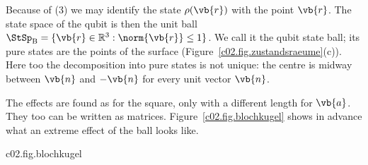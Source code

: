 Because of (3) we may identify the state $\rho(\vb{r})$ with the point $\vb{r}$. The state
space of the qubit is then the unit ball
$\StSp_{\mathrm{B}} = \{ \vb{r} \in \mathbb{R}^3 : \norm{\vb{r}} \leq 1 \}$. We call it
the qubit state ball; its pure states are the points of the surface
(Figure~\ref{c02.fig.zustandsraeume}(c)). Here too the decomposition into pure states is
not unique: the centre is midway between $\vb{n}$ and $-\vb{n}$ for every unit vector
$\vb{n}$.

The effects are found as for the square, only with a different length for $\vb{a}$. They
too can be written as matrices. Figure~\ref{c02.fig.blochkugel} shows in advance what an
extreme effect of the ball looks like.

\begin{tpcfigure}{c02.fig.blochkugel}
  \caption{The qubit state ball with the extreme effect
    $f_{\vb{n}}(\vb{r}) = \tfrac12(1 + \vb{n}\cdot\vb{r})$ of
    Proposition~\ref{c02.prop.qubit-effekte} for $\vb{n} = (0,0,1)$, that is,
    $f_{\vb{n}}(\vb{r}) = \tfrac12(1 + r_z)$. The points of equal probability form
    horizontal planes. The plane $f = 1$ touches the ball in the pure state $\vb{n}$
    (top), the plane $f = 0$ in the pure state $-\vb{n}$ (bottom). The state $x$ lies at
    height $r_z = \tfrac12$; there $f = \tfrac34$. For an effect that is not
    constant and not extreme, at most one of the two planes $f = 0$ and $f = 1$ touches the
    ball; one of them may still touch it. A constant effect has the same value everywhere;
    its level sets are not planes.}
\end{tpcfigure}

